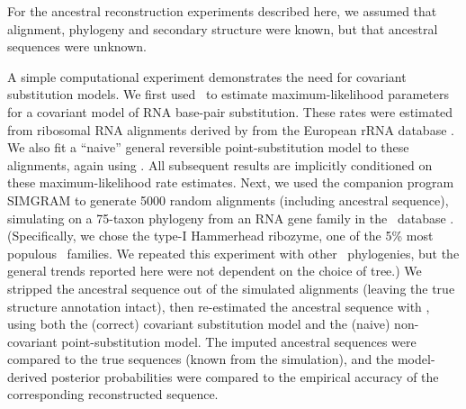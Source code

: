 \documentclass[10pt]{article}
\begin{document}
For the ancestral reconstruction experiments described here,
we assumed that alignment, phylogeny and secondary structure were known,
but that ancestral sequences were unknown.

A simple computational experiment demonstrates the need for covariant substitution models.
We first used \xrate\ to estimate maximum-likelihood parameters for a covariant model of RNA base-pair substitution.
These rates were estimated from ribosomal RNA alignments
derived by \cite{DowellEddy2006} from the European rRNA database \cite{WuytsEtAl2004}.
We also fit a ``naive'' general reversible point-substitution model to these alignments, again using \xrate.
All subsequent results are implicitly conditioned on these maximum-likelihood rate estimates.
Next, we used the companion program SIMGRAM to generate 5000 random alignments (including ancestral sequence),
simulating on a 75-taxon phylogeny from an RNA gene family in the \RFAM\ database \cite{GriffithsJonesEtAl2003}.
(Specifically, we chose the type-I Hammerhead ribozyme, one of the 5\% most populous \RFAM\ families.
 We repeated this experiment with other \RFAM\ phylogenies, but the general trends reported here were not dependent on the choice of tree.)
We stripped the ancestral sequence out of the simulated alignments (leaving the true structure annotation intact),
then re-estimated the ancestral sequence with \xrate, using both the (correct) covariant substitution model and the (naive) non-covariant point-substitution model.
The imputed ancestral sequences were compared to the true sequences (known from the simulation),
and the model-derived posterior probabilities were compared to the empirical accuracy of the corresponding reconstructed sequence.
\end{document}
